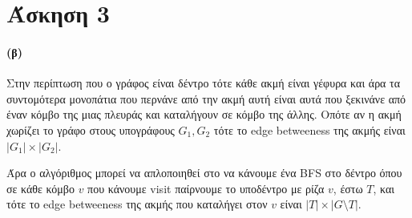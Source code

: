 \documentclass[a4paper,11pt]{article}
\begin{document}





\section*{Άσκηση 3}

\paragraph{(β)} Στην περίπτωση που ο γράφος είναι δέντρο τότε κάθε ακμή είναι γέφυρα και άρα τα συντομότερα μονοπάτια που περνάνε από την ακμή αυτή είναι αυτά που ξεκινάνε από έναν κόμβο της μιας πλευράς και καταλήγουν σε κόμβο της άλλης.
Οπότε αν η ακμή χωρίζει το γράφο στους υπογράφους $G_1,G_2$ τότε το edge betweeness της ακμής είναι $|G_1| \times |G_2|$.

Άρα ο αλγόριθμος μπορεί να απλοποιηθεί στο να κάνουμε ένα BFS στο δέντρο όπου σε κάθε κόμβο $v$ που κάνουμε visit παίρνουμε το υποδέντρο με ρίζα $v$, έστω $T$, και τότε το edge betweeness της ακμής που καταλήγει στον $v$ είναι $|T| \times |G \setminus T|$.
\end{document}
